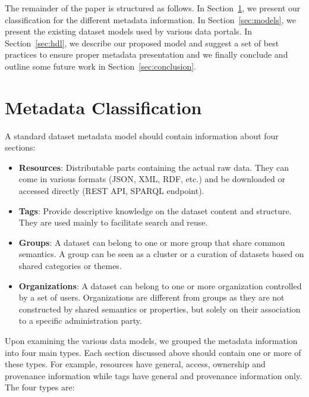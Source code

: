 \documentclass[runningheads,a4paper]{llncs}
\begin{document}
The remainder of the paper is structured as follows. In Section~\ref{sec:metadata}, we present our classification for the different metadata information. In Section~\ref{sec:models}, we present the existing dataset models used by various data portals. In Section~\ref{sec:hdl}, we describe our proposed model and suggest a set of best practices to ensure proper metadata presentation and we finally conclude and outline some future work in Section~\ref{sec:conclusion}.

\section{Metadata Classification}
\label{sec:metadata}

A standard dataset metadata model should contain information about four sections:

\begin{itemize}
  \item \textbf{Resources}: Distributable parts containing the actual raw data. They can come in various formats (JSON, XML, RDF, etc.) and be downloaded or accessed directly (REST API, SPARQL endpoint).
  \item \textbf{Tags}: Provide descriptive knowledge on the dataset content and structure. They are used mainly to facilitate search and reuse.
  \item \textbf{Groups}: A dataset can belong to one or more group that share common semantics. A group can be seen as a cluster or a curation of datasets based on shared categories or themes.
  \item \textbf{Organizations}: A dataset can belong to one or more organization controlled by a set of users. Organizations are different from groups as they are not constructed by shared semantics or properties, but solely on their association to a specific administration party.
\end{itemize}

Upon examining the various data models, we grouped the metadata information into four main types. Each section discussed above should contain one or more of these types. For example, resources have general, access, ownership and provenance information while tags have general and provenance information only. The four types are:
\end{document}
